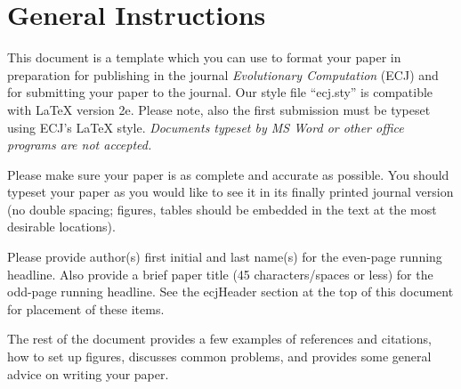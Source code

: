 \documentclass[twoside]{article}
\begin{document}
\section{General Instructions}

This document
is a template which you can use to format your paper in 
preparation for publishing in the journal {\em Evolutionary Computation} 
(ECJ) and for submitting your paper to the journal. Our style file 
``ecj.sty'' is compatible with \LaTeX{} version 2e. Please note, also the 
first submission must be typeset using ECJ's \LaTeX{} style. {\em Documents 
typeset by MS Word or other office programs are not accepted.}   

Please make sure your paper is as complete and accurate as possible. You 
should typeset your paper as you would like to see it 
in its finally printed journal version (no double spacing; figures, tables 
should be embedded in the text at the most desirable locations). 

Please provide author(s) first initial and last name(s) for the even-page 
running headline. Also provide a brief paper title (45 characters/spaces or 
less) for the odd-page running headline.  See the ecjHeader section at the 
top of this document for placement of these items.

The rest of the document provides a few examples of references and 
citations, how to set up figures, discusses common problems, and provides some
general advice on writing your paper.
\end{document}
